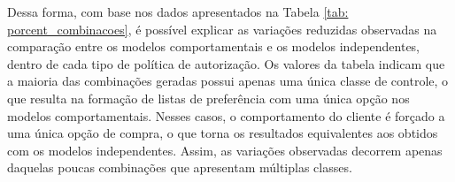 \begin{table}[H]
	\centering
	\footnotesize  %
	\caption{Quantidade de combinações, por instância, que possuem mais de 1 classe de controle}
	\label{tab: porcent_combinacoes}
\end{table}

Dessa forma, com base nos dados apresentados na Tabela \ref{tab: porcent_combinacoes}, é possível explicar as variações reduzidas observadas na comparação entre os modelos comportamentais e os modelos independentes, dentro de cada tipo de política de autorização. Os valores da tabela indicam que a maioria das combinações geradas possui apenas uma única classe de controle, o que resulta na formação de listas de preferência com uma única opção nos modelos comportamentais. Nesses casos, o comportamento do cliente é forçado a uma única opção de compra, o que torna os resultados equivalentes aos obtidos com os modelos independentes. Assim, as variações observadas decorrem apenas daquelas poucas combinações que apresentam múltiplas classes.



